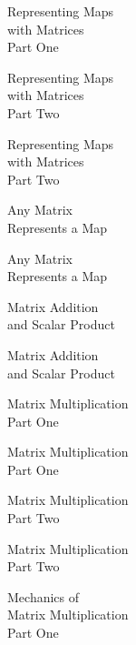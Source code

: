 \documentclass{titlescreen}
\begin{document}
\begin{videotitle}
  Representing Maps  \\[0.5ex]
  with Matrices  \\[1ex]
  Part One
\end{videotitle}
\begin{videoend}
  Representing Maps  \\[0.5ex]
  with Matrices  \\[1ex]
  Part Two
\end{videoend}

%
\begin{videotitle}
  Representing Maps  \\[0.5ex]
  with Matrices  \\[1ex]
  Part Two
\end{videotitle}
\begin{videoend}
  Any Matrix \\[0.5ex]
  Represents a Map
\end{videoend}

%
\begin{videotitle}
  Any Matrix \\[0.5ex]
  Represents a Map
\end{videotitle}
\begin{videoend}
  Matrix Addition  \\[0.5ex]
  and Scalar Product 
\end{videoend}

\begin{videotitle}
  Matrix Addition  \\[0.5ex]
  and Scalar Product 
\end{videotitle}
\begin{videoend}
  Matrix Multiplication  \\[1ex]
  Part One
\end{videoend}

\begin{videotitle}
  Matrix Multiplication  \\[1ex]
  Part One
\end{videotitle}
\begin{videoend}
  Matrix Multiplication  \\[1ex]
  Part Two
\end{videoend}

\begin{videotitle}
  Matrix Multiplication  \\[1ex]
  Part Two
\end{videotitle}
\begin{videoend}
  Mechanics of \\[0.5ex]
  Matrix Multiplication  \\[1ex]
  Part One
\end{videoend}
\end{document}
